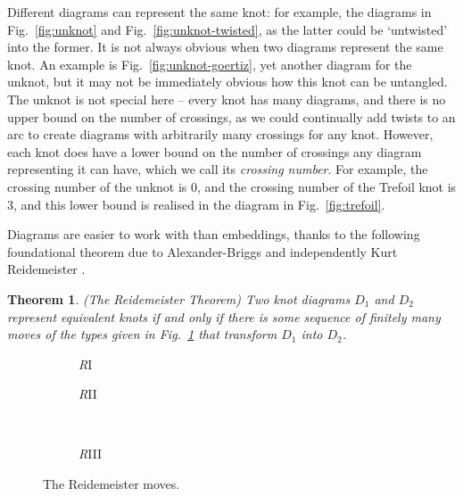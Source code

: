 \documentclass[12pt]{report}
\newtheorem*{theorem}{Theorem}
\theoremstyle{upright}
\begin{document}
Different diagrams can represent the same knot: for example, the diagrams in Fig.~\ref{fig:unknot} and Fig.~\ref{fig:unknot-twisted}, as the latter could be `untwisted' into the former. It is not always obvious when two diagrams represent the same knot. An example is Fig.~\ref{fig:unknot-goertiz}, yet another diagram for the unknot, but it may not be immediately obvious how this knot can be untangled. The unknot is not special here -- every knot has many diagrams, and there is no upper bound on the number of crossings, as we could continually add twists to an arc to create diagrams with arbitrarily many crossings for any knot. However, each knot does have a lower bound on the number of crossings any diagram representing it can have, which we call its \textit{crossing number}. For example, the crossing number of the unknot is $0$, and the crossing number of the Trefoil knot is $3$, and this lower bound is realised in the diagram in Fig.~\ref{fig:trefoil}.

Diagrams are easier to work with than embeddings, thanks to the following foundational theorem due to Alexander-Briggs  \cite{types-of-knotted-curves} and independently Kurt Reidemeister \cite{elementary-justification-knot-theory}.
\begin{theorem}(The Reidemeister Theorem)
Two knot diagrams $D_{1}$ and $D_{2}$ represent equivalent knots if and only if there is some sequence of finitely many moves of the types given in Fig.~\ref{fig:reidemeister_moves} that transform $D_{1}$ into $D_{2}$.
\end{theorem}

\begin{figure}[hbt!]
	\centering
	\hspace*{\fill}
	\begin{subfigure}[b]{0.35 \textwidth}
		\centering
		\def\svgscale{0.22}
		
		\caption{\textit{R}I}
	\end{subfigure}
	\hspace*{\fill}
	\begin{subfigure}[b]{0.35 \textwidth}
		\centering
		\def\svgscale{0.22}
		
		\caption{\textit{R}II}
	\end{subfigure}
	\hspace*{\fill}
	\\
	\hspace*{\fill}
	\begin{subfigure}[b]{0.35 \textwidth}
		\centering
		\def\svgscale{0.22}
		
		\caption{\textit{R}III}
	\end{subfigure}
	\hspace*{\fill}
	\caption{The Reidemeister moves.}
	\label{fig:reidemeister_moves}
\end{figure}
\end{document}

